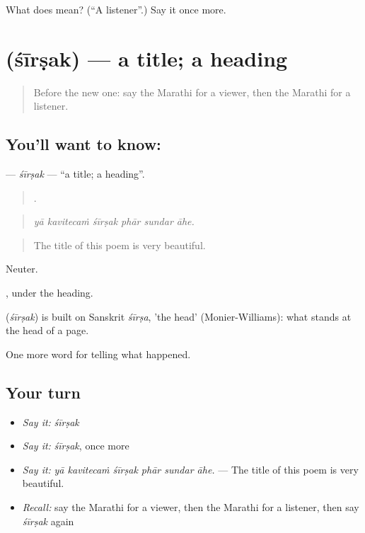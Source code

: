 \begin{tcolorbox}[breakable,colback=teal!4,colframe=teal!35!black,title={Before you move on}]
What does  mean? (\textquotedblleft{}A listener\textquotedblright{}.) Say it once more.
\end{tcolorbox}
\section[\texorpdfstring{\mr{शीर्षक} (śīrṣak)}{शीर्षक (śīrṣak)}]{ (śīrṣak) — a title; a heading}

\label{lesson:MR-C314-sirsak}



\begin{quote}
Before the new one: say the Marathi for a viewer, then the Marathi for a listener.
\end{quote}

\subsection*{You'll want to know: }
\textbf{} — \emph{śīrṣak} — \textquotedblleft{}a title; a heading\textquotedblright{}.

\begin{quote}
     .
\end{quote}

\begin{quote}
\emph{yā kavitecaṁ śīrṣak phār sundar āhe.}
\end{quote}

\begin{quote}
The title of this poem is very beautiful.
\end{quote}

Neuter.

, under the heading.

\begin{cousinweb}
\textbf{} (\emph{śīrṣak}) is built on Sanskrit \emph{śīrṣa}, 'the head' (Monier-Williams): what stands at the head of a page.
\end{cousinweb}

\begin{grammarlens}[title={What you've built}]
One more word for telling what happened.
\end{grammarlens}

\subsection*{Your turn}
\begin{itemize}
\raggedright
  \item \emph{Say it:} \emph{śīrṣak}
  \item \emph{Say it:} \emph{śīrṣak}, once more
  \item \emph{Say it:} \emph{yā kavitecaṁ śīrṣak phār sundar āhe.} — The title of this poem is very beautiful.
  \item \emph{Recall:} say the Marathi for a viewer, then the Marathi for a listener, then say \emph{śīrṣak} again
\end{itemize}

